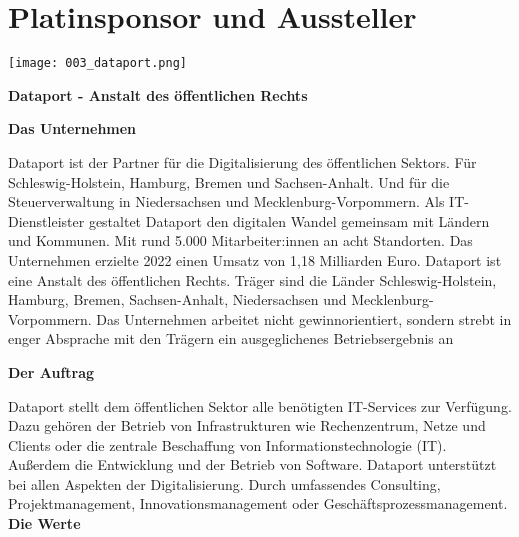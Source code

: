\section*{Platinsponsor und Aussteller}
\vspace*{-0.7\baselineskip}
  \texttt{[image: 003\_dataport.png]}
  
\noindent
    {\bfseries Dataport - Anstalt des öffentlichen Rechts}
    
\noindent
    {\bfseries Das Unternehmen}
    
\noindent    
Dataport ist der Partner für die Digitalisierung des öffentlichen Sektors. Für Schleswig-Holstein, Hamburg, Bremen und Sachsen-Anhalt. Und für die Steuerverwaltung in Niedersachsen und Meck\-lenburg-Vorpommern. Als IT-Dienstleister gestaltet Dataport den digitalen Wandel gemeinsam mit Ländern und Kommunen. Mit rund 5.000 Mitarbeiter:innen an acht Standorten. Das Unternehmen erzielte 2022 einen Umsatz von 1,18 Milliarden Euro.    
Dataport ist eine Anstalt des öffentlichen Rechts. Träger sind die Länder Schleswig-Holstein, Hamburg, Bremen, Sachsen-Anhalt, Niedersachsen und Meck\-lenburg-Vorpommern. Das Unternehmen arbeitet nicht gewinnorientiert, sondern strebt in enger Absprache mit den Trägern ein ausgeglichenes Betriebsergebnis an

\noindent
{\bfseries Der Auftrag}

\noindent
Dataport stellt dem öffentlichen Sektor alle benötigten IT-Services zur Verfügung. Dazu gehören der Betrieb von Infrastrukturen wie Rechenzentrum, Netze und Clients oder die zentrale Beschaffung von Informationstechnologie (IT). Außerdem die Entwicklung und der Betrieb von Software. Dataport unterstützt bei allen Aspekten der Digitalisierung. Durch umfassendes Consulting, Projektmanagement, Innovationsmanagement oder Geschäftsprozessmanagement.
\newpage
\noindent
{\bfseries Die Werte}

